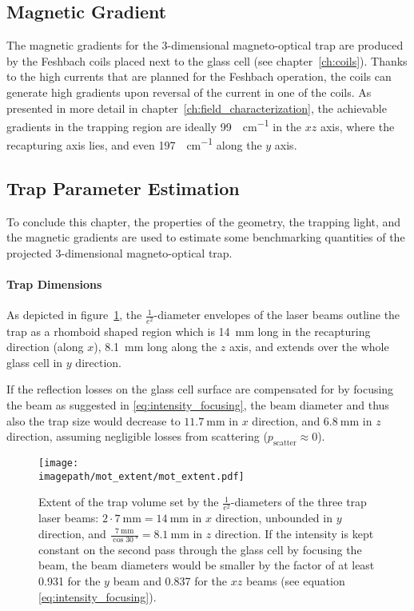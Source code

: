 \subsection*{Magnetic Gradient}
The magnetic gradients for the 3-dimensional magneto-optical trap are produced by the Feshbach coils placed next to the glass cell (see chapter~\ref{ch:coils}). Thanks to the high currents that are planned for the Fesh\-bach operation, the coils can generate high gradients upon reversal of the current in one of the coils. As presented in more detail in chapter~\ref{ch:field_characterization}, the achievable gradients in the trapping region are ideally \SI{99}{\gauss\per\centi\meter} in the $xz$ axis, where the recapturing axis lies, and even \SI{197}{\gauss\per\centi\meter} along the $y$ axis.

\subsection*{Trap Parameter Estimation}
To conclude this chapter, the properties of the geometry, the trapping light, and the magnetic gradients are used to estimate some benchmarking quantities of the projected 3-dimensional magneto-optical trap.

\paragraph{Trap Dimensions}
As depicted in figure~\ref{fig:mot_extent}, the  $\frac{1}{e^2}$-diameter envelopes of the laser beams outline the trap as a rhomboid shaped region which is \SI[]{14}{\milli\meter} long in the recapturing direction (along $x$), \SI[]{8.1}{\milli\meter} long along the $z$ axis, and extends over the whole glass cell in $y$ direction.

If the reflection losses on the glass cell surface are compensated for by focusing the beam as suggested in \eqref{eq:intensity_focusing}, the beam diameter and thus also the trap size would decrease to $\SI[]{11.7}{\milli\meter}$ in $x$ direction, and $\SI[]{6.8}{\milli\meter}$ in $z$ direction, assuming negligible losses from scattering ($p_\text{scatter} \approx 0$).

\begin{figure}
    \centering
    \texttt{[image: \\imagepath/mot\_extent/mot\_extent.pdf]}
    \caption{Extent of the trap volume set by the $\frac{1}{e^2}$-diameters of the three trap laser beams: $2\cdot \SI[]{7}{\milli\meter} = \SI[]{14}{\milli\meter}$ in $x$ direction, unbounded in $y$ direction, and $\frac{\SI[]{7}{\milli\meter}}{\cos \SI[]{30}{\degree}} = \SI[]{8.1}{\milli\meter}$ in $z$ direction. If the intensity is kept constant on the second pass through the glass cell by focusing the beam, the beam diameters would be smaller by the factor of at least \SI{0.931}{} for the $y$ beam and \SI{0.837}{} for the $xz$ beams (see equation \ref{eq:intensity_focusing}).}
    \label{fig:mot_extent}
\end{figure}

